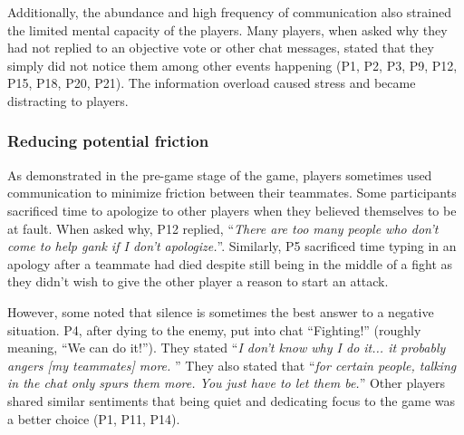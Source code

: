 Additionally, the abundance and high frequency of communication also strained the limited mental capacity of the players. Many players, when asked why they had not replied to an objective vote or other chat messages, stated that they simply did not notice them among other events happening (P1, P2, P3, P9, P12, P15, P18, P20, P21). The information overload caused stress and became distracting to players.

\subsubsection{Reducing potential friction}
As demonstrated in the pre-game stage of the game, players sometimes used communication to minimize friction between their teammates. Some participants sacrificed time to apologize to other players when they believed themselves to be at fault. When asked why, P12 replied, ``\textit{There are too many people who don't come to help gank if I don't apologize.}''. Similarly, P5 sacrificed time typing in an apology after a teammate had died despite still being in the middle of a fight as they didn't wish to give the other player a reason to start an attack.

However, some noted that silence is sometimes the best answer to a negative situation. P4, after dying to the enemy, put into chat ``Fighting!'' (roughly meaning, ``We can do it!''). They stated ``\textit{I don't know why I do it... it probably angers [my teammates] more.
}'' They also stated that ``\textit{for certain people, talking in the chat only spurs them more. You just have to let them be.}'' Other players shared similar sentiments that being quiet and dedicating focus to the game was a better choice (P1, P11, P14).

